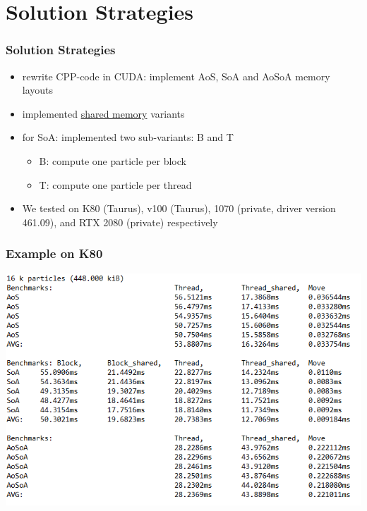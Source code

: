 \documentclass[aspectratio=169]{beamer}
\begin{document}
\section{Solution Strategies}
\begin{frame}
	\frametitle{Solution Strategies}
	\begin{itemize}
		\item rewrite CPP-code in CUDA: implement AoS, SoA and AoSoA memory layouts
		\item implemented \underline{shared memory} variants
		\item for SoA: implemented two sub-variants: B and T
			\begin{itemize}
				\item B: compute one particle per block
				\item T: compute one particle per thread
			\end{itemize}
		\item We tested on K80 (Taurus), v100 (Taurus), 1070 (private, driver version 461.09), and RTX 2080 (private) respectively
	\end{itemize}
\end{frame}

\begin{frame}
	\frametitle{Example on K80}
	\includegraphics[scale=0.5]{resources/data-example.png}
\end{frame}
\end{document}
